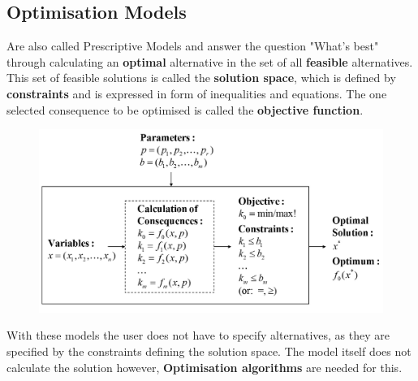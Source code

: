 \documentclass[11pt]{article}
\begin{document}
\subsection{Optimisation Models}
Are also called Prescriptive Models and answer the question "What's best" through calculating an \textbf{optimal} alternative in the set of all \textbf{feasible} alternatives. This set of feasible solutions is called the \textbf{solution space}, which is defined by \textbf{constraints} and is expressed in form of inequalities and equations. The one selected consequence to be optimised is called the \textbf{objective function}.

\begin{figure}[htb]
	\centering
	\includegraphics[width=0.6\linewidth, keepaspectratio]{img/model_functionality}
	\caption{}
	\label{fig:modelfunctionality}
\end{figure}

With these models the user does not have to specify alternatives, as they are specified by the constraints defining the solution space. The model itself does not calculate the solution however, \textbf{Optimisation algorithms} are needed for this.
\end{document}
